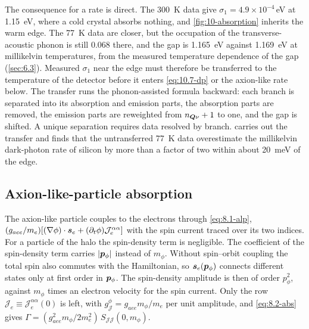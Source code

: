 The consequence for a rate is direct. The \SI{300}{K} data give $\sigma_1 = 4.9\times10^{-4}$\,eV at \SI{1.15}{eV}, where a cold crystal absorbs nothing, and \cref{fig:10-absorption} inherits the warm edge. The \SI{77}{K} data are closer, but the occupation of the transverse-acoustic phonon is still 0.068 there, and the gap is \SI{1.165}{eV} against \SI{1.169}{eV} at millikelvin temperatures, from the measured temperature dependence of the gap~\cite{alex1996temperature} (\cref{sec:6.3}). Measured $\sigma_1$ near the edge must therefore be transferred to the temperature of the detector before it enters \cref{eq:10.7-dp} or the axion-like rate below. The transfer runs the phonon-assisted formula backward: each branch is separated into its absorption and emission parts, the absorption parts are removed, the emission parts are reweighted from $n_{\bm{Q}\nu} + 1$ to one, and the gap is shifted. A unique separation requires data resolved by branch.  carries out the transfer and finds that the untransferred \SI{77}{K} data overestimate the millikelvin dark-photon rate of silicon by more than a factor of two within about \SI{20}{meV} of the edge.

\subsection{Axion-like-particle absorption}\label{sec:10.7-alp}

The axion-like particle couples to the electrons through \cref{eq:8.1-alp}, $(g_{aee}/m_e)[(\nabla\phi)\cdot\bm{s}_e + (\partial_t\phi)\mathcal{J}^{\alpha\alpha}_e]$ with the spin current traced over its two indices. For a particle of the halo the spin-density term is negligible. The coefficient of the spin-density term carries $|\bm{p}_\phi|$ instead of $m_\phi$. Without spin--orbit coupling the total spin also commutes with the Hamiltonian, so $\bm{s}_e(\bm{p}_\phi)$ connects different states only at first order in $\bm{p}_\phi$. The spin-density amplitude is then of order $p_\phi^2$, against $m_\phi$ times an electron velocity for the spin current. Only the row $\mathcal{J}_e \equiv \mathcal{J}^{\alpha\alpha}_e(0)$ is left, with $g^\phi_{\mathcal{J}} = g_{aee}m_\phi/m_e$ per unit amplitude, and \cref{eq:8.2-abs} gives $\varGamma = (g_{aee}^2m_\phi/2m_e^2)\,S_{\mathcal{J}\mathcal{J}}(0, m_\phi)$.

